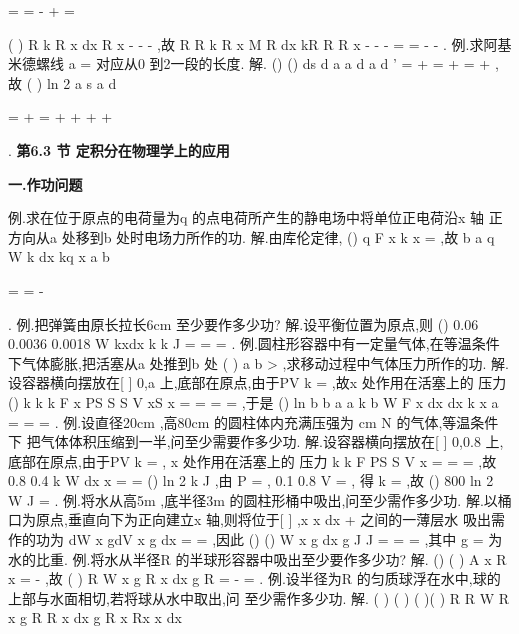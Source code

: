 =
=
-
+
=




(
)
R
k
R
x
dx
R
x
-
-
-
,故
R
R
k
R
x
M
R
dx
kR
R
R
x
\pi 
-
-
-
=
=
-
-
\int 
. 
\textcolor{lyred}{例}.求阿基米德螺线
a
\rho 
\theta 
=
对应\theta 从0 到2\pi 一段的长度. 
解.
()
()
ds
d
a
a d
a
d
\rho 
\theta 
\rho 
\theta 
\theta 
\theta 
\theta 
\theta 
\theta 
'
=
+
=
+
=
+
,故 
(
)
ln 2
a
s
a
d
\pi 
\theta 
\theta 
\pi 
\pi 
\pi 
\pi 


=
+
=
+
+
+
+




\int 
. 
\vspace{6pt}
{\large \bfseries \textcolor{lyred}{第6.3 节 定积分在物理学上的应用}}

\vspace{4pt}
{\bfseries \textcolor{lyred}{一.作功问题}}

\textcolor{lyred}{例}.求在位于原点的电荷量为q 的点电荷所产生的静电场中将单位正电荷沿x 轴 
正方向从a 处移到b 处时电场力所作的功. 
解.由库伦定律,
()
q
F x
k x
\cdots 
=
,故
b
a
q
W
k
dx
kq
x
a
b


=
=
-




\int 
. 
\textcolor{lyred}{例}.把弹簧由原长拉长6cm 至少要作多少功? 
解.设平衡位置为原点,则
()
0.06
0.0036
0.0018
W
kxdx
k
k J
=
=
\cdots 
=
\int 
. 
\textcolor{lyred}{例}.圆柱形容器中有一定量气体,在等温条件下气体膨胀,把活塞从a 处推到b 处 
(
)
a
b
>
,求移动过程中气体压力所作的功. 
解.设容器横向摆放在[
]
0,a 上,底部在原点,由于PV
k
=
,故x 处作用在活塞上的 
压力
()
k
k
k
F x
PS
S
S
V
xS
x
=
=
=
=
,于是
()
ln
b
b
a
a
k
b
W
F x dx
dx
k
x
a
=
=
=
\int 
\int 
. 
\textcolor{lyred}{例}.设直径20cm ,高80cm 的圆柱体内充满压强为
cm
N
的气体,等温条件下 
把气体体积压缩到一半,问至少需要作多少功. 
解.设容器横向摆放在[
]
0,0.8 上,底部在原点,由于PV
k
=
, x 处作用在活塞上的 
压力
k
k
F
PS
S
V
x
=
=
=
,故
0.8
0.4
k
W
dx
x
=
=
\int 
()
ln 2
k
J ,由
P =
,
0.1
0.8
V
\pi 
=
\times 
\times 
, 
得
k
\pi 
=
,故
()
800 ln 2
W
J
\pi 
=
. 
\textcolor{lyred}{例}.将水从高5m ,底半径3m 的圆柱形桶中吸出,问至少需作多少功. 
解.以桶口为原点,垂直向下为正向建立x 轴,则将位于[
]
,x x
dx
+
之间的一薄层水 
吸出需作的功为
dW
x
gdV
x
g
dx
\rho 
\rho 
\pi 
=
\cdots 
=
\cdots 
\cdots 
,因此 
()
()
W
x
g
dx
g
J
J
\rho 
\pi 
\rho \pi 
\gamma \pi 
=
\cdots 
\cdots 
=
=
\int 
,其中
g
\gamma 
\rho 
=
为水的比重. 
\textcolor{lyred}{例}.将水从半径R 的半球形容器中吸出至少要作多少功? 
解.
()
(
)
A x
R
x
\pi 
=
-
,故
(
)
R
W
x
g
R
x
dx
g R
\rho 
\pi 
\rho \pi 
=
\cdots 
\cdots 
-
=
\int 
. 
\textcolor{lyred}{例}.设半径为R 的匀质球浮在水中,球的上部与水面相切,若将球从水中取出,问 
至少需作多少功. 
解.
(
)
(
)
(
)(
)
R
R
W
R
x
g
R
R
x
dx
g
R
x
Rx
x
dx
\rho \pi 
\rho \pi 


